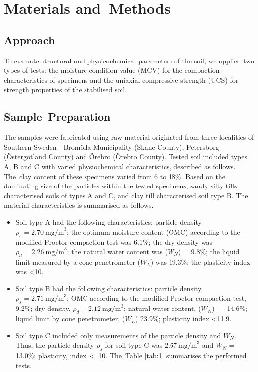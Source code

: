 \documentclass[electronics,article,accept,pdftex,moreauthors]{Definitions/mdpi}
\begin{document}
\section{Materials and~Methods}

\subsection{Approach}

To evaluate{ }structural and physicochemical {parameters} of the soil, we applied two types of tests: the moisture condition value (MCV) for the compaction characteristics of specimens{ }and the uniaxial compressive strength (UCS) {for strength properties of the stabilised soil}. 

\subsection{Sample~Preparation}
The {samples }were fabricated {using} raw material originated {from three localities of Southern Sweden---Brom\"olla Municipality (Sk\aa ne County), Petersborg (\"Osterg\"otland County) and \"Orebro (\"Orebro County). Tested} soil included{ }types A, B and C with varied physiochemical characteristics, described as follows. The~clay content of {these} specimens varied from 6 to 18\%. Based on the dominating size of the particles within the tested specimens, {sandy silty tills characterised} soils of types A and C, {and clay till characterised} soil type B. {The material characteristics is summarised as follows.}

\begin{itemize}
     \item Soil type A had the following characteristics: particle density $\rho _s =2.70~\text{mg/m}^3$; the optimum moisture content (OMC) according to the modified Proctor compaction test was 6.1\%; the dry density was $\rho _d = 2.26 ~\text{mg/m}^3$; %
     the natural water content was ($W_N$) = 9.8\%; the liquid limit measured by a cone penetrometer ($W_L$) was 19.3\%; the plasticity index was <10. 
     \item Soil type B had the following characteristics: particle density, $\rho _s = 2.71~\text{mg/m}^3$; OMC according to the modified Proctor compaction test, 9.2\%; dry density, $\rho _d = 2.12 ~\text{mg/m}^3$; natural water content, \mbox{($W_N$) = 14.6\%}; liquid limit by cone penetrometer, ($W_L$) 23.9\%; plasticity index <11.9. 
     \item Soil type C included only measurements of the particle density and $W_N$. Thus, the particle density $\rho _s$ for soil type C was $2.67 ~\text{mg/m}^3$ and $W_N$ = 13.0\%; plasticity, \mbox{index < 10}. The~{Table} \ref{tab:1} summarises the performed tests{.} 
\end{itemize}\vspace{-6pt}
\end{document}
